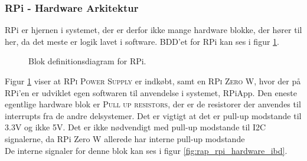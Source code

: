 \documentclass[Rapport/Rapport_main.tex]{subfiles}
\begin{document}
\subsubsection{RPi - Hardware Arkitektur}
RPi er hjernen i systemet, der er derfor ikke mange hardware blokke, der hører til her, da det meste er logik lavet i software. BDD'et for RPi kan ses i figur \ref{fig:rap_rpi_hardware_bdd}.
\begin{figure}[H]
    \centering
    \caption{Blok definitionsdiagram for RPi.}
    \label{fig:rap_rpi_hardware_bdd}
\end{figure}
Figur \ref{fig:rap_rpi_hardware_bdd} viser at \textsc{RPi Power Supply} er indkøbt, samt en \textsc{RPi Zero W}, hvor der på RPi'en er udviklet egen softwaren til anvendelse i systemet, RPiApp. Den eneste egentlige hardware blok er \textsc{Pull up resistors}, der er de resistorer der anvendes til interrupts fra de andre delsystemer. Det er vigtigt at det er pull-up modstande til 3.3V og ikke 5V. Det er ikke nødvendigt med pull-up modstande til I2C signalerne, da RPi Zero W allerede har interne pull-up modstande \\
De interne signaler for denne blok kan ses i figur \ref{fig:rap_rpi_hardware_ibd}.
\end{document}
